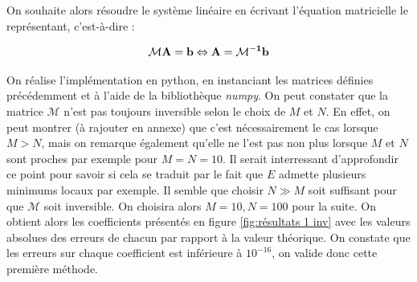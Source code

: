 \documentclass[12pt]{report}
\begin{document}
On souhaite alors résoudre le système linéaire en écrivant 
l'équation matricielle le représentant, c'est-à-dire :

\begin{equation}
    \mathcal{M} \bf{A} = \bf{b} \Leftrightarrow \bf{A} = \mathcal{M}^{-1}\bf{b}
\label{eq:équation matricielle}
\end{equation}

On réalise l'implémentation en python, en instanciant 
les matrices définies précédemment et à l'aide de la bibliothèque \emph{numpy}. 
On peut constater que la matrice $\mathcal{M}$ n'est pas toujours inversible
selon le choix de $M$ et $N$. En effet, on peut montrer {\color{red}(à rajouter en annexe)} que c'est nécessairement le cas lorsque $M>N$, 
mais on remarque également qu'elle ne l'est pas non plus lorsque $M$ et $N$ sont proches par exemple pour $M=N=10$. Il serait interressant d'approfondir ce point
pour savoir si cela se traduit par le fait que $E$ admette plusieurs minimums locaux par exemple.
Il semble que choisir $N\gg M$ soit suffisant pour que $\mathcal{M}$ soit inversible. On choisira alors $M=10, N=100$ pour la suite.
On obtient alors les coefficients présentés en figure \ref{fig:résultats 1 inv} avec les valeurs absolues des erreurs de chacun par rapport à la valeur théorique. 
On constate que les erreurs sur chaque coefficient
est inférieure à $10^{-16}$, on valide donc cette première méthode.
\end{document}

